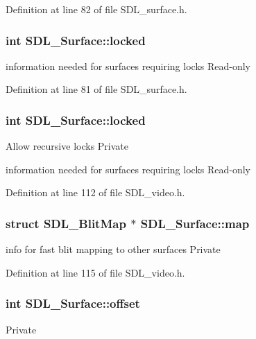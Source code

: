 Definition at line 82 of file S\+D\+L\+\_\+surface.\+h.

\hypertarget{structSDL__Surface_a5022edaeea1c0a055fa5d6dccba41de2}{
\subsubsection[{locked}]{\setlength{\rightskip}{0pt plus 5cm}int S\+D\+L\+\_\+\+Surface\+::locked}}\label{structSDL__Surface_a5022edaeea1c0a055fa5d6dccba41de2}
information needed for surfaces requiring locks Read-\/only 

Definition at line 81 of file S\+D\+L\+\_\+surface.\+h.

\hypertarget{structSDL__Surface_a5022edaeea1c0a055fa5d6dccba41de2}{
\subsubsection[{locked}]{\setlength{\rightskip}{0pt plus 5cm}int S\+D\+L\+\_\+\+Surface\+::locked}}\label{structSDL__Surface_a5022edaeea1c0a055fa5d6dccba41de2}
Allow recursive locks Private

information needed for surfaces requiring locks Read-\/only 

Definition at line 112 of file S\+D\+L\+\_\+video.\+h.

\hypertarget{structSDL__Surface_ae6fcc0962eb9a59b4c795fe8e3bd49ad}{
\subsubsection[{map}]{\setlength{\rightskip}{0pt plus 5cm}struct S\+D\+L\+\_\+\+Blit\+Map $\ast$ S\+D\+L\+\_\+\+Surface\+::map}}\label{structSDL__Surface_ae6fcc0962eb9a59b4c795fe8e3bd49ad}
info for fast blit mapping to other surfaces Private 

Definition at line 115 of file S\+D\+L\+\_\+video.\+h.

\hypertarget{structSDL__Surface_ab40c060fa976dbb25bebc7869132ffda}{
\subsubsection[{offset}]{\setlength{\rightskip}{0pt plus 5cm}int S\+D\+L\+\_\+\+Surface\+::offset}}\label{structSDL__Surface_ab40c060fa976dbb25bebc7869132ffda}
Private 

